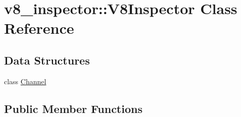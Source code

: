 \hypertarget{classv8__inspector_1_1V8Inspector}{}\section{v8\+\_\+inspector\+:\+:V8\+Inspector Class Reference}
\label{classv8__inspector_1_1V8Inspector}
\subsection*{Data Structures}
\begin{DoxyCompactItemize}
\item 
class \mbox{\hyperlink{classv8__inspector_1_1V8Inspector_1_1Channel}{Channel}}
\end{DoxyCompactItemize}
\subsection*{Public Member Functions}
